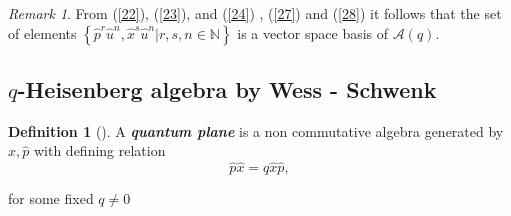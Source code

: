 \documentclass[12pt,a4paper]{article}
\theoremstyle{plain}
\theoremstyle{definition}
\newtheorem{definition}[theorem]{Definition}
\theoremstyle{remark}
\newtheorem{remark}[theorem]{Remark}
\begin{document}
\begin{remark}
From (\ref{22}), (\ref{23}), and (\ref{24}) , (\ref{27}) and (\ref{28}) it follows that the set of elements $\left\lbrace\hat{p}^{r}\hat{u}^{n}, \hat{x}^{s}\hat{u}^{n}\vert r, s,n\in\mathbb{N}\right\rbrace$ is a vector space basis of $\mathcal{A}(q)$.
\end{remark}


\subsection{\texorpdfstring{$q$}{Lg}-Heisenberg algebra by Wess - Schwenk}

\begin{definition}[{\cite[p. 1]{Wess-Zumino1990, Chen-Lu-2021}}]
A \textit{\textbf{quantum plane}} is a non commutative algebra generated by $\hat{x}, \hat{p}$ with defining relation 
\begin{equation}\label{quantum-plane}
  \hat{p}\hat{x}=q\hat{x}\hat{p},
\end{equation}

for some fixed $q\neq 0$  
\end{definition}
\end{document}
